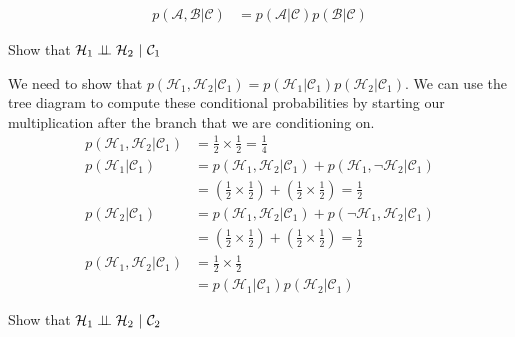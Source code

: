 \documentclass[assignment02_Solutions]{subfiles}
\begin{document}
\begin{align}
p(\mathcal{A}, \mathcal{B} | \mathcal{C}) &= p(\mathcal{A} | \mathcal{C}) p(\mathcal{B} | \mathcal{C}) \nonumber
\end{align}

\begin{exercise}[(20 minutes)]
\bes
\item Show that $\mathcal{H}_1 \perp\!\!\!\perp \mathcal{H}_2~|~\mathcal{C}_1$
\begin{boxedsolution}
We need to show that $p(\mathcal{H}_1 , \mathcal{H}_2 | \mathcal{C}_1) = p(\mathcal{H}_1 | \mathcal{C}_1) p(\mathcal{H}_2 | \mathcal{C}_1)$.  We can use the tree diagram to compute these conditional probabilities by starting our multiplication after the branch that we are conditioning on.
\begin{align}
p(\mathcal{H}_1 , \mathcal{H}_2 | \mathcal{C}_1)  &= \frac{1}{2} \times \frac{1}{2} = \frac{1}{4} \nonumber \\
p(\mathcal{H}_1 | \mathcal{C}_1) &= p(\mathcal{H}_1, \mathcal{H}_2 | \mathcal{C}_1) + p(\mathcal{H}_1, \neg \mathcal{H}_2 | \mathcal{C}_1) \nonumber \\
&= \left ( \frac{1}{2} \times \frac{1}{2} \right) + \left ( \frac{1}{2} \times \frac{1}{2} \right) = \frac{1}{2} \nonumber \\
p(\mathcal{H}_2 | \mathcal{C}_1) &= p(\mathcal{H}_1, \mathcal{H}_2 | \mathcal{C}_1) + p(\neg \mathcal{H}_1,  \mathcal{H}_2 | \mathcal{C}_1) \nonumber \\
&= \left ( \frac{1}{2} \times \frac{1}{2} \right) + \left ( \frac{1}{2} \times \frac{1}{2} \right) = \frac{1}{2} \nonumber \\
p(\mathcal{H}_1 , \mathcal{H}_2 | \mathcal{C}_1) &=  \frac{1}{2} \times \frac{1}{2} \nonumber \\
&= p(\mathcal{H}_1 | \mathcal{C}_1) p(\mathcal{H}_2 | \mathcal{C}_1) \nonumber
\end{align}
\end{boxedsolution}
\item Show that $\mathcal{H}_1 \perp\!\!\!\perp \mathcal{H}_2~|~\mathcal{C}_2$


\end{exercise}
\end{document}
